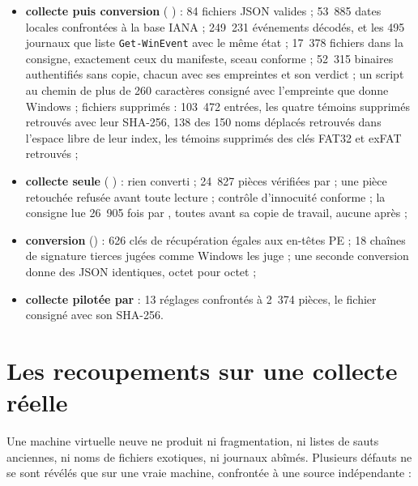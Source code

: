 \documentclass[11pt,a4paper,oneside]{report}
\begin{document}
\begin{itemize}
  \item \textbf{collecte puis conversion} ( 
    ) : 84 fichiers JSON valides ; 53~885 dates locales
    confrontées à la base IANA ; 249~231 événements décodés, et les 495
    journaux que liste \texttt{Get-WinEvent} avec le même état ; 17~378
    fichiers dans la consigne, exactement ceux du manifeste, sceau conforme ;
    52~315 binaires authentifiés sans copie, chacun avec ses empreintes et son
    verdict ; un script au chemin de plus de 260 caractères consigné avec
    l'empreinte que donne Windows ; fichiers supprimés : 103~472 entrées, les
    quatre témoins supprimés retrouvés avec leur SHA-256, 138 des 150 noms
    déplacés retrouvés dans l'espace libre de leur index, les témoins supprimés
    des clés FAT32 et exFAT retrouvés ;
  \item \textbf{collecte seule} (  ) :
    rien converti ; 24~827 pièces vérifiées par  ;
    une pièce retouchée refusée avant toute lecture ; contrôle d'innocuité
    conforme ; la consigne lue 26~905 fois par , toutes avant
    sa copie de travail, aucune après ;
  \item \textbf{conversion} () : 626 clés de récupération égales
    aux en-têtes PE ; 18 chaînes de signature tierces jugées comme Windows les
    juge ; une seconde conversion donne des JSON identiques, octet pour octet ;
  \item \textbf{collecte pilotée par } : 13 réglages
    confrontés à 2~374 pièces, le fichier consigné avec son SHA-256.
\end{itemize}

\chapter{Les recoupements sur une collecte réelle}\label{ch:reel}

Une machine virtuelle neuve ne produit ni fragmentation, ni listes de sauts
anciennes, ni noms de fichiers exotiques, ni journaux abîmés. Plusieurs
défauts ne se sont révélés que sur une vraie machine, confrontée à une source
indépendante :
\end{document}

